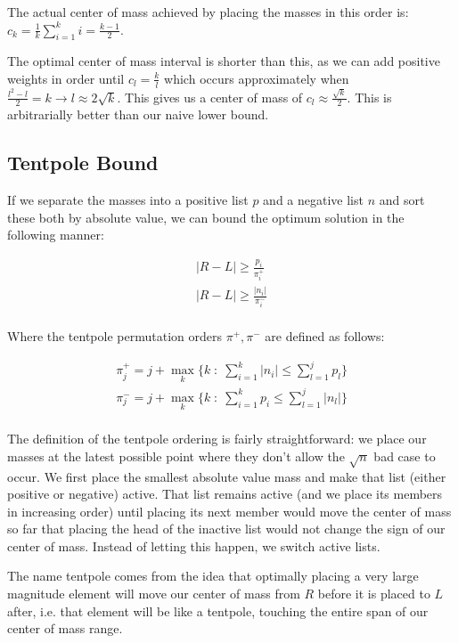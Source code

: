 \documentclass[11pt,twocolumn]{article}
\begin{document}
The actual center of mass achieved by placing the masses in this order is: $ c_k = \frac{1}{k} \sum_{i=1}^k i = \frac{k-1}{2} $.

The optimal center of mass interval is shorter than this, as we can add positive weights in order until $ c_l = \frac{k}{l} $ which occurs approximately when $ \frac{l^2 - l}{2} = k \rightarrow l \approx 2\sqrt{k} $. This gives us a center of mass of $ c_l \approx \frac{\sqrt{k}}{2} $.  This is arbitrarially better than our naive lower bound.

\subsection{Tentpole Bound} \label{subs:tentpoleBound}

If we separate the masses into a positive list $ p $ and a negative list $ n $ and sort these both by absolute value, we can bound the optimum solution in the following manner:

\begin{eqnarray*}
|R-L| \geq \frac{p_{i}}{\pi^+_i} \\
|R-L| \geq \frac{|n_{i}|}{\pi^-_i} \\
\end{eqnarray*} 

Where the tentpole permutation orders $ \pi^+, \pi^- $ are defined as follows:

\begin{eqnarray*}
\pi^+_j = j + \max_k \{ k \; :\; \sum_{i=1}^k |n_i| \leq \sum_{l=1}^j p_l \}  \\
\pi^-_j = j + \max_k \{ k \; :\; \sum_{i=1}^k p_i \leq \sum_{l=1}^j |n_l| \} \\
\end{eqnarray*} 

The definition of the tentpole ordering is fairly straightforward: we place our masses at the latest possible point where they don't allow the $\sqrt{n}$ bad case to occur.  We first place the smallest absolute value mass and make that list (either positive or negative) active.  That list remains active (and we place its members in increasing order) until placing its next member would move the center of mass so far that placing the head of the inactive list would not change the sign of our center of mass.  Instead of letting this happen, we switch active lists.

The name tentpole comes from the idea that optimally placing a very large magnitude element will move our center of mass from $R$ before it is placed to $L$ after, i.e. that element will be like a tentpole, touching the entire span of our center of mass range.
\end{document}
